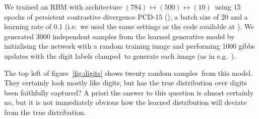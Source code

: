 \documentclass{article} %
\def\ie{i.e.\ }
\def\eg{e.g.\ }
\begin{document}
We trained an RBM with architecture $(784)\leftrightarrow(500)\leftrightarrow(10)$\footnotemark~using 15 epochs of persistent contrastive divergence PCD-15 (), a batch size of 20 and a learning rate of 0.1 (\ie we used the same settings as the code available at ).
We generated 3000 independent samples from the learned generative model by initialising the network with a random training image and performing 1000 gibbs updates with the digit labels clamped\footnotemark~to generate each image (as in \eg \cite{Hinton2007-eo}).

The top left of figure~\ref{fig:digits} shows twenty random samples\footnotemark~from this model.
They certainly look mostly like digits, but has the true distribution over digits been faithfully captured?
A priori the answer to this question is almost certainly no, but it is not immediately obvious how the learned distribution will deviate from the true distribution.
\end{document}
